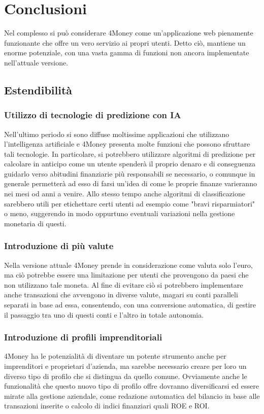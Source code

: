 \documentclass[binding=0.6cm, oneside, noexaminfo, italian]{sapthesis}
\begin{document}
\section{Conclusioni}
Nel complesso si può considerare 4Money come un'applicazione web pienamente funzionante che offre un vero servizio ai propri utenti. Detto ciò, mantiene un enorme potenziale, con una vasta gamma di funzioni non ancora implementate nell'attuale versione.
\subsection{Estendibilità}
\subsubsection{Utilizzo di tecnologie di predizione con IA}
Nell'ultimo periodo si sono diffuse moltissime applicazioni che utilizzano l'intelligenza artificiale e 4Money presenta molte funzioni che possono sfruttare tali tecnologie. In particolare, si potrebbero utilizzare algoritmi di predizione per calcolare in anticipo come un utente spenderà il proprio denaro e di conseguenza guidarlo verso abitudini finanziarie più responsabili se necessario, o comunque in generale permetterà ad esso di farsi un'idea di come le proprie finanze varieranno nei mesi od anni a venire. Allo stesso tempo anche algoritmi di classificazione sarebbero utili per etichettare certi utenti ad esempio come "bravi risparmiatori" o meno, suggerendo in modo oppurtuno eventuali variazioni nella gestione monetaria di questi.
\subsubsection{Introduzione di più valute}
Nella versione attuale 4Money prende in considerazione come valuta solo l'euro, ma ciò potrebbe essere una limitazione per utenti che provengono da paesi che non utilizzano tale moneta. Al fine di evitare ciò si potrebbero implementare anche transazioni che avvengono in diverse valute, magari su conti paralleli separati in base ad essa, consentendo, con una conversione automatica, di gestire il passaggio tra uno di questi conti e l'altro in totale autonomia.
\subsubsection{Introduzione di profili imprenditoriali}
4Money ha le potenzialità di diventare un potente strumento anche per imprenditori e proprietari d'azienda, ma sarebbe necessario creare per loro un diverso tipo di profilo che si distingua da quello comune. Ovviamente anche le funzionalità che questo nuovo tipo di profilo offre dovranno diversificarsi ed essere mirate alla gestione aziendale, come redazione automatica del bilancio in base alle transazioni inserite o calcolo di indici finanziari quali ROE e ROI.
\end{document}
